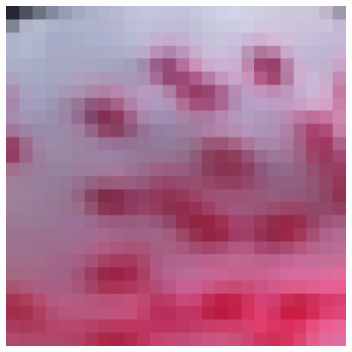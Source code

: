 \documentclass[review,numbers,sort&compress]{elsarticle}  %
\begin{document}
\begin{figure}[htbp]
{\begin{minipage}[b]{0.12\textwidth}
                \includegraphics[width=1\textwidth]{compareImage/LapSRN_flowers_mag_2.png}
            \end{minipage}
        }   
\end{figure}
\end{document}
